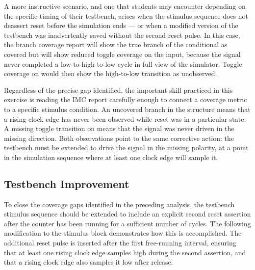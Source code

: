 A more instructive scenario, and one that students may encounter depending on the specific timing of their testbench, arises when the stimulus sequence does not deassert reset before the simulation ends — or when a modified version of the testbench was inadvertently saved without the second reset pulse. In this case, the branch coverage report will show the true branch of the  conditional as covered but will show reduced toggle coverage on the  input, because the signal never completed a low-to-high-to-low cycle in full view of the simulator. Toggle coverage on  would then show the high-to-low transition as unobserved.\

Regardless of the precise gap identified, the important skill practiced in this exercise is reading the IMC report carefully enough to connect a coverage metric to a specific stimulus condition. An uncovered branch in the  structure means that a rising clock edge has never been observed while reset was in a particular state. A missing toggle transition on  means that the signal was never driven in the missing direction. Both observations point to the same corrective action: the testbench must be extended to drive the  signal in the missing polarity, at a point in the simulation sequence where at least one clock edge will sample it.\

\subsection{Testbench Improvement}

To close the coverage gaps identified in the preceding analysis, the testbench stimulus sequence should be extended to include an explicit second reset assertion after the counter has been running for a sufficient number of cycles. The following modification to the stimulus  block demonstrates how this is accomplished. The additional reset pulse is inserted after the first free-running interval, ensuring that at least one rising clock edge samples  high during the second assertion, and that a rising clock edge also samples it low after release:


